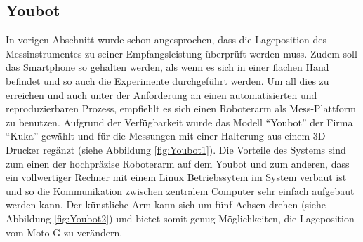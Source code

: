 \subsection{Youbot}
In vorigen Abschnitt wurde schon angesprochen, dass die Lageposition des Messinstrumentes zu seiner Empfangsleistung überprüft werden muss. Zudem soll das Smartphone so gehalten werden, als wenn es sich in einer flachen Hand befindet und so auch die Experimente durchgeführt werden. Um all dies zu erreichen und auch unter der Anforderung an einen automatisierten und reproduzierbaren Prozess, empfiehlt es sich einen Roboterarm als Mess-Plattform zu benutzen. Aufgrund der Verfügbarkeit wurde das Modell "`Youbot"' der Firma "`Kuka"' gewählt und für die Messungen mit einer Halterung aus einem 3D-Drucker regänzt (siehe Abbildung \ref{fig:Youbot1}). Die Vorteile des Systems sind zum einen der hochpräzise Roboterarm auf dem Youbot und zum anderen, dass ein vollwertiger Rechner mit einem Linux Betriebssytem im System verbaut ist und so die Kommunikation zwischen zentralem Computer sehr einfach aufgebaut werden kann. Der künstliche Arm kann sich um fünf Achsen drehen (siehe Abbildung \ref{fig:Youbot2}) und bietet somit genug Möglichkeiten, die Lageposition vom Moto G zu verändern. 
